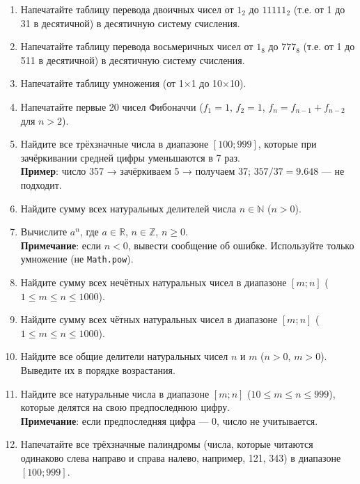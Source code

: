 \documentclass[12pt]{article}
\begin{document}
\begin{enumerate}
    \item Напечатайте таблицу перевода двоичных чисел от $1_2$ до $11111_2$ (т.е. от 1 до 31 в десятичной) в десятичную систему счисления.

    \item Напечатайте таблицу перевода восьмеричных чисел от $1_8$ до $777_8$ (т.е. от 1 до 511 в десятичной) в десятичную систему счисления.

    \item Напечатайте таблицу умножения (от 1×1 до 10×10).

    \item Напечатайте первые 20 чисел Фибоначчи ($f_1 = 1$, $f_2 = 1$, $f_{n} = f_{n-1} + f_{n-2}$ для $n > 2$).

    \item Найдите все трёхзначные числа в диапазоне $[100; 999]$, которые при зачёркивании средней цифры уменьшаются в 7 раз. \\
    \textbf{Пример}: число 357 → зачёркиваем 5 → получаем 37; $357 / 37 = 9.648$ — не подходит.

    \item Найдите сумму всех натуральных делителей числа $n \in \mathbb{N}$ ($n > 0$).

    \item Вычислите $a^n$, где $a \in \mathbb{R}$, $n \in \mathbb{Z}$, $n \geqslant 0$. \\
    \textbf{Примечание}: если $n < 0$, вывести сообщение об ошибке. Используйте только умножение (не \verb|Math.pow|).

    \item Найдите сумму всех нечётных натуральных чисел в диапазоне $[m; n]$ ($1 \leqslant m \leqslant n \leqslant 1000$).

    \item Найдите сумму всех чётных натуральных чисел в диапазоне $[m; n]$ ($1 \leqslant m \leqslant n \leqslant 1000$).

    \item Найдите все общие делители натуральных чисел $n$ и $m$ ($n > 0$, $m > 0$). Выведите их в порядке возрастания.

    \item Найдите все натуральные числа в диапазоне $[m; n]$ ($10 \leqslant m \leqslant n \leqslant 999$), которые делятся на свою предпоследнюю цифру. \\
    \textbf{Примечание}: если предпоследняя цифра — 0, число не учитывается.

    \item Напечатайте все трёхзначные палиндромы (числа, которые читаются одинаково слева направо и справа налево, например, 121, 343) в диапазоне $[100; 999]$.


\end{enumerate}
\end{document}
